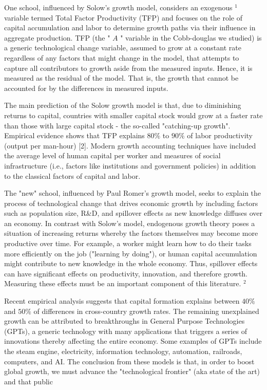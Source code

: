 \documentclass[10pt]{article}
\begin{document}
One school, influenced by Solow's growth model, considers an exogenous ${ }^{1}$ variable termed Total Factor Productivity (TFP) and focuses on the role of capital accumulation and labor to determine growth paths via their influence in aggregate production. TFP (the " $A$ " variable in the Cobb-douglas we studied) is a generic technological change variable, assumed to grow at a constant rate regardless of any factors that might change in the model, that attempts to capture all contributors to growth aside from the measured inputs. Hence, it is measured as the residual of the model. That is, the growth that cannot be accounted for by the differences in measured inputs.

The main prediction of the Solow growth model is that, due to diminishing returns to capital, countries with smaller capital stock would grow at a faster rate than those with large capital stock - the so-called "catching-up growth". Empirical evidence shows that TFP explains $80 \%$ to $90 \%$ of labor productivity (output per man-hour) [2]. Modern growth accounting techniques have included the average level of human capital per worker and measures of social infrastructure (i.e., factors like institutions and government policies) in addition to the classical factors of capital and labor.

The "new" school, influenced by Paul Romer's growth model, seeks to explain the process of technological change that drives economic growth by including factors such as population size, R\&D, and spillover effects as new knowledge diffuses over an economy. In contrast with Solow's model, endogenous growth theory poses a situation of increasing returns whereby the factors themselves may become more productive over time. For example, a worker might learn how to do their tasks more efficiently on the job ("learning by doing"), or human capital accumulation might contribute to new knowledge in the whole economy. Thus, spillover effects can have significant effects on productivity, innovation, and therefore growth. Measuring these effects must be an important component of this literature. ${ }^{2}$

Recent empirical analysis suggests that capital formation explains between $40 \%$ and $50 \%$ of differences in cross-country growth rates. The remaining unexplained growth can be attributed to breakthroughs in General Purpose Technologies (GPTs), a generic technology with many applications that triggers a series of innovations thereby affecting the entire economy. Some examples of GPTs include the steam engine, electricity, information technology, automation, railroads, computers, and AI. The conclusion from these models is that, in order to boost global growth, we must advance the "technological frontier" (aka state of the art) and that public
\end{document}
